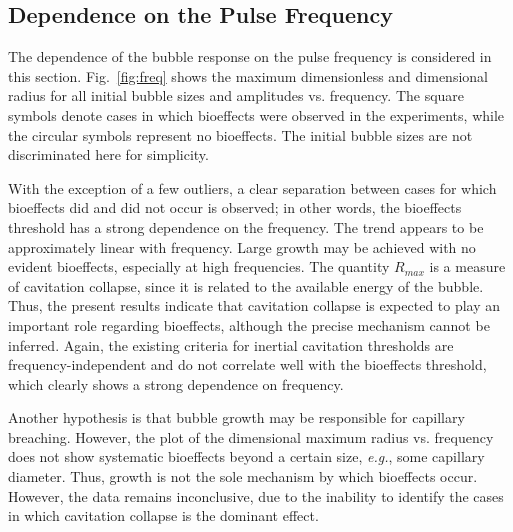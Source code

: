 \documentclass[%
preprint,%
author-year,%
]{jasatex}
\begin{document}
\subsection{Dependence on the Pulse Frequency}

The dependence of the bubble response on the pulse frequency is
considered in this section.  Fig.~\ref{fig:freq} shows the maximum
dimensionless and dimensional radius for all initial bubble sizes and
amplitudes vs. frequency. The square symbols denote cases in which
bioeffects were observed in the experiments, while the circular symbols
represent no bioeffects. The initial bubble sizes are not
discriminated here for simplicity.


\begin{figure*}[t]
   \caption{(color online) Dependence of the bubble dynamics on the frequency for
     $G=100$ kPa. $R_0=0.1-2$ $\mu$m; empty circles: no bioeffects; squares:
     bioeffects.}
  \label{fig:freq}
\end{figure*}

With the exception of a few outliers, a clear separation between cases
for which bioeffects did and did not occur is observed; in other
words, the bioeffects threshold has a strong dependence on the
frequency. The trend appears to be approximately linear with
frequency. Large growth may be achieved with no evident bioeffects,
especially at high frequencies. The quantity $R_{max}$ is a
measure of cavitation collapse, since it is related to the available
energy of the bubble. Thus, the present results indicate that
cavitation collapse is expected to play an important role regarding
bioeffects, although the precise mechanism cannot be inferred.  Again,
the existing criteria for inertial cavitation thresholds are
frequency-independent and do not correlate well with the bioeffects
threshold, which clearly shows a strong dependence on frequency.

Another hypothesis is that bubble growth may be responsible for
capillary breaching. However, the plot of the dimensional maximum radius vs. frequency does
not show systematic bioeffects beyond a certain size, \emph{e.g.},
some capillary diameter. Thus, growth is not the sole mechanism by
which bioeffects occur. However, the data remains inconclusive,
due to the inability to identify the cases in which cavitation
collapse is the dominant effect.
\end{document}
